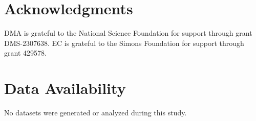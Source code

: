 \documentclass[11pt,reqno,xcolor=svgnames]{amsart}
\theoremstyle{plain}
\theoremstyle{definition}
\theoremstyle{plain}
\theoremstyle{remark}
\begin{document}
\section*{Acknowledgments} DMA is grateful to the National Science Foundation
for support through grant DMS-2307638. EC is grateful to the Simons Foundation
for support through grant 429578.  

\section*{Data Availability} No datasets were generated or analyzed during this study.






    
\end{document}
